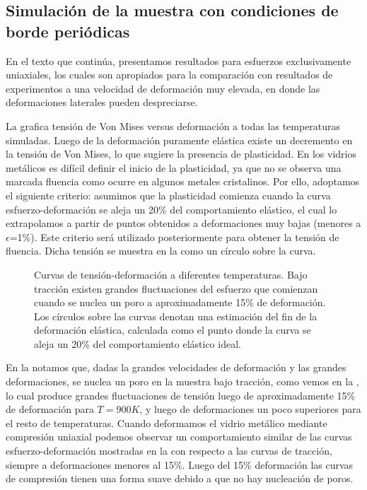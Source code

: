 \subsection{Simulación de la muestra con condiciones de borde periódicas}
\label{S3_3_1}

En el texto que continúa, presentamos resultados para esfuerzos exclusivamente uniaxiales, los cuales son apropiados para la comparación con resultados de experimentos a una velocidad de deformación muy elevada, en donde las deformaciones laterales pueden despreciarse. 

La  grafica tensión de Von Mises versus deformación a todas las temperaturas simuladas. Luego de la deformación puramente elástica existe un decremento en la tensión de Von Mises, lo que sugiere la presencia de plasticidad. En los vidrios metálicos es difícil definir el inicio de la plasticidad, ya que no se observa una marcada fluencia como ocurre en algunos metales cristalinos. Por ello, adoptamos el siguiente criterio: asumimos que la plasticidad comienza cuando la curva esfuerzo-deformación se aleja un 20\% del comportamiento elástico, el cual lo extrapolamos a partir de puntos obtenidos a deformaciones muy bajas (menores a $\epsilon$=1\%). Este criterio será utilizado posteriormente para obtener la tensión de fluencia. Dicha tensión se muestra en la  como un círculo sobre la curva.

\begin{figure}[htp]
\centering
{}
\caption[Curvas de tensión-deformación a diferentes temperaturas]{Curvas de tensión-deformación a diferentes temperaturas. Bajo tracción existen grandes fluctuaciones del esfuerzo que comienzan cuando se nuclea un poro a aproximadamente 15\% de deformación. Los círculos sobre las curvas denotan una estimación del fin de la deformación elástica, calculada como el punto donde la curva se aleja un 20\% del comportamiento elástico ideal.}
\label{C3:fg:sStrain}
\end{figure}

En la  notamos que, dadas la grandes velocidades de deformación y las grandes deformaciones, se nuclea un poro en la muestra bajo tracción, como vemos en la , lo cual produce grandes fluctuaciones de tensión luego de aproximadamente 15\% de deformación para $T=900K$, y luego de deformaciones un poco superiores para el resto de temperaturas. Cuando deformamos el vidrio metálico mediante compresión uniaxial podemos observar un comportamiento similar de las curvas esfuerzo-deformación mostradas en la  con respecto a las curvas de tracción, siempre a deformaciones menores al 15\%. Luego del 15\% deformación las curvas de compresión tienen una forma suave debido a que no hay nucleación de poros.

